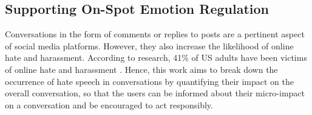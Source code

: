 \documentclass[acmtog]{acmart}
\begin{document}


\subsection{Supporting On-Spot Emotion Regulation}
Conversations in the form of comments or replies to posts are a pertinent aspect of social media platforms. However, they also increase the likelihood of online hate and harassment. According to research, 41\% of US adults have been victims of online hate and harassment \cite{thomas2022s}. Hence, this work aims to break down the occurrence of hate speech in conversations by quantifying their impact on the overall conversation, so that the users can be informed about their micro-impact on a conversation and be encouraged to act responsibly.
\end{document}
